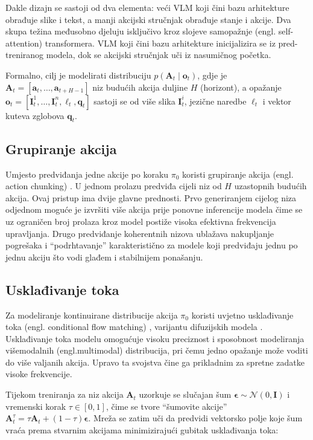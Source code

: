 \documentclass[times, utf8, diplomski]{fer}
\begin{document}
Dakle dizajn se sastoji od dva elementa: veći VLM koji čini bazu arhitekture obrađuje slike i tekst, a manji akcijski stručnjak obrađuje stanje i akcije. Dva skupa težina međusobno djeluju isključivo kroz slojeve samopažnje (engl. self-attention) transformera. VLM koji čini bazu arhitekture inicijalizira se iz pred-treniranog modela, dok se akcijski stručnjak uči iz nasumičnog početka.
 
Formalno, cilj je modelirati distribuciju $p(\mathbf{A}_t \mid \mathbf{o}_t)$, gdje je $\mathbf{A}_t = [\mathbf{a}_t, \dots, \mathbf{a}_{t+H-1}]$ niz budućih akcija duljine $H$ (horizont), a opažanje $\mathbf{o}_t = [\mathbf{I}^1_t, \dots, \mathbf{I}^n_t, \ell_t, \mathbf{q}_t]$ sastoji se od više slika $\mathbf{I}^i_t$, jezične naredbe $\ell_t$ i vektor kuteva zglobova $\mathbf{q}_t$.
 
\subsection{Grupiranje akcija}
 
Umjesto predviđanja jedne akcije po koraku $\pi_0$ koristi grupiranje akcija (engl. action chunking) \cite{zhao2023aloha}. U jednom prolazu predviđa cijeli niz od $H$ uzastopnih budućih akcija. Ovaj pristup ima dvije glavne prednosti. Prvo generiranjem cijelog niza odjednom moguće je izvršiti više akcija prije ponovne inferencije modela čime se uz ograničen broj prolaza kroz model postiže visoka efektivna frekvencija upravljanja. Drugo predviđanje koherentnih nizova ublažava nakupljanje pogrešaka i ``podrhtavanje'' karakteristično za modele koji predviđaju jednu po jednu akciju što vodi glađem i stabilnijem ponašanju.

\subsection{Usklađivanje toka}
 
Za modeliranje kontinuirane distribucije akcija $\pi_0$ koristi uvjetno usklađivanje toka (engl. conditional flow matching) \cite{lipman2022flowmatching}, varijantu difuzijskih modela \cite{ho2020ddpm}. Usklađivanje toka modelu omogućuje visoku preciznost i sposobnost modeliranja višemodalnih (engl.multimodal) distribucija, pri čemu jedno opažanje može voditi do više valjanih akcija. Upravo ta svojstva čine ga prikladnim za spretne zadatke visoke frekvencije.

Tijekom treniranja za niz akcija $\mathbf{A}_t$ uzorkuje se slučajan šum $\boldsymbol{\epsilon} \sim \mathcal{N}(0, \mathbf{I})$ i vremenski korak $\tau \in [0, 1]$, čime se tvore ``šumovite akcije'' $\mathbf{A}^{\tau}_t = \tau \mathbf{A}_t + (1 - \tau)\boldsymbol{\epsilon}$. Mreža se zatim uči da predvidi vektorsko polje koje šum vraća prema stvarnim akcijama minimizirajući gubitak usklađivanja toka:
\end{document}
